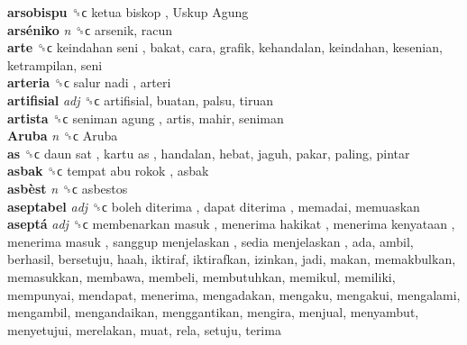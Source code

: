 \textbf{arsobispu} ␝ϲ   ketua biskop ,  Uskup Agung   \\
\textbf{arséniko} \emph{n}  ␝ϲ  arsenik, racun  \\
\textbf{arte} ␝ϲ   keindahan seni , bakat, cara, grafik, kehandalan, keindahan, kesenian, ketrampilan, seni  \\
\textbf{arteria} ␝ϲ   salur nadi , arteri  \\
\textbf{artifisial} \emph{adj}  ␝ϲ  artifisial, buatan, palsu, tiruan  \\
\textbf{artista} ␝ϲ   seniman agung , artis, mahir, seniman  \\
\textbf{Aruba} \emph{n}  ␝ϲ   Aruba   \\
\textbf{as} ␝ϲ   daun sat ,  kartu as , handalan, hebat, jaguh, pakar, paling, pintar  \\
\textbf{asbak} ␝ϲ   tempat abu rokok , asbak  \\
\textbf{asbèst} \emph{n}  ␝ϲ  asbestos  \\
\textbf{aseptabel} \emph{adj}  ␝ϲ   boleh diterima ,  dapat diterima , memadai, memuaskan  \\
\textbf{aseptá} \emph{adj}  ␝ϲ   membenarkan masuk ,  menerima hakikat ,  menerima kenyataan ,  menerima masuk ,  sanggup menjelaskan ,  sedia menjelaskan , ada, ambil, berhasil, bersetuju, haah, iktiraf, iktirafkan, izinkan, jadi, makan, memakbulkan, memasukkan, membawa, membeli, membutuhkan, memikul, memiliki, mempunyai, mendapat, menerima, mengadakan, mengaku, mengakui, mengalami, mengambil, mengandaikan, menggantikan, mengira, menjual, menyambut, menyetujui, merelakan, muat, rela, setuju, terima  \\
